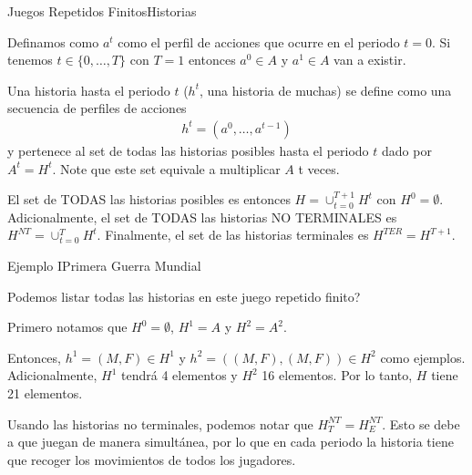 \documentclass[notes, 11pt]{beamer} %
\newenvironment{wideitemize}{\itemize\addtolength{\itemsep}{10pt}}{\enditemize}
\begin{document}
\begin{frame}{Juegos Repetidos Finitos}{Historias}
	\begin{wideitemize}
		\item<1-> Definamos como $a^{t}$ como el perfil de acciones que ocurre en el periodo $t=0$. Si tenemos $t \in \{0,\dots, T\}$ con $T=1$ entonces $a^{0} \in A$ y $a^{1} \in A$ van a existir.
		\item<2-> Una historia hasta el periodo $t$ ($h^{t}$, una historia de muchas) se define como una secuencia de perfiles de acciones
		\begin{align*}
			h^{t} = (a^{0}, \dots, a^{t-1})
		\end{align*} y pertenece al set de todas las historias posibles hasta el periodo $t$ dado por $A^{t} = H^{t}$. Note que este set equivale a multiplicar $A$ t veces.
		\item<3-> El set de TODAS las historias posibles es entonces $H = \cup_{t=0}^{T+1} H^{t}$ con $H^{0} = \emptyset$. Adicionalmente, el set de TODAS las historias NO TERMINALES es $H^{NT} = \cup_{t=0}^{T} H^{t}$. Finalmente, el set de las historias terminales es $H^{TER} = H^{T+1}$.
	\end{wideitemize}
\end{frame}

\begin{frame}{Ejemplo I}{Primera Guerra Mundial}
	\begin{wideitemize}
		\item<1-> Podemos listar todas las historias en este juego repetido finito?
		\item<2-> Primero notamos que $H^{0} = \emptyset$, $H^{1} = A$ y $H^{2} = A^{2}$.
		\item<3-> Entonces, $h^{1} = (M,F) \in H^{1}$ y $h^{2} = ((M,F),(M,F)) \in H^{2}$ como ejemplos. Adicionalmente, $H^{1}$ tendr\'a 4 elementos y $H^{2}$ 16 elementos. Por lo tanto, $H$ tiene 21 elementos.
		\item<4-> Usando las historias no terminales, podemos notar que $H^{NT}_{T} = H^{NT}_{E}$. Esto se debe a que juegan de manera simult\'anea, por lo que en cada periodo la historia tiene que recoger los movimientos de todos los jugadores.
	\end{wideitemize}
\end{frame}
\end{document}
